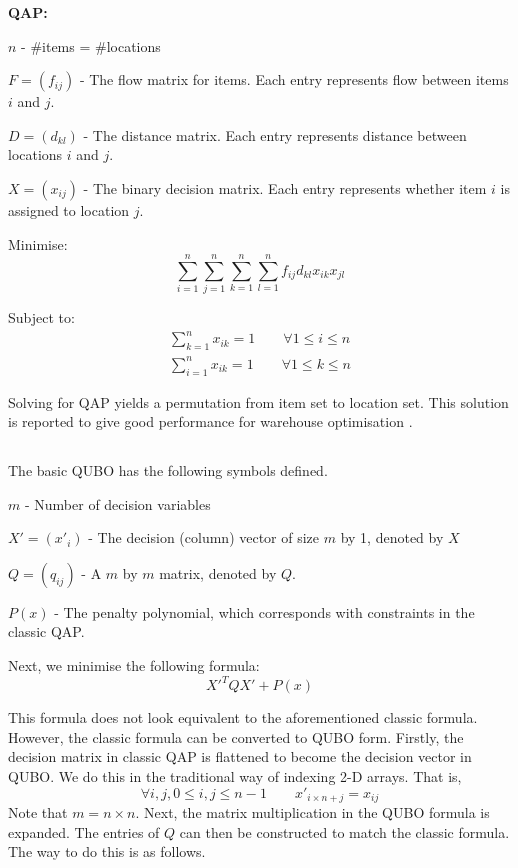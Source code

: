 \documentclass[hyp]{socreport}
\begin{document}
\textbf{QAP:}

$n$ - \#items = \#locations

$F = (f_{ij})$ - The flow matrix for items. Each entry represents flow between items $i$ and $j$.

$D = (d_{kl})$ - The distance matrix. Each entry represents distance between locations $i$ and $j$.

$X = (x_{ij})$ - The binary decision matrix. Each entry represents whether item $i$ is assigned to location $j$.

Minimise:
\begin{equation}
\sum_{i=1}^{n}\sum_{j=1}^{n}\sum_{k=1}^{n}\sum_{l=1}^{n}f_{ij}d_{kl}x_{ik}x_{jl}\end{equation}

Subject to:
\begin{align}
\sum_{k=1}^{n}x_{ik}=1 \qquad \forall 1\leq i \leq n \\
\sum_{i=1}^{n}x_{ik}=1 \qquad \forall 1\leq k \leq n
\end{align}

Solving for QAP yields a permutation from item set to location set. This solution is reported to give good performance for warehouse optimisation \cite{Mantel:2007}.

\subsection{}

The basic QUBO has the following symbols defined.

$m$		- Number of decision variables

$X'=(x'_i)$ - The decision (column) vector of size $m$ by 1, denoted by $X$

$Q=(q_{ij})$ - A $m$ by $m$ matrix, denoted by $Q$.

$P(x)$	- The penalty polynomial, which corresponds with constraints in the classic QAP.

Next, we minimise the following formula:
\[X'^TQX' + P(x)\]

This formula does not look equivalent to the aforementioned classic formula. However, the classic formula can be converted to QUBO form. Firstly, the decision matrix in classic QAP is flattened to become the decision vector in QUBO. We do this in the traditional way of indexing 2-D arrays. That is, \[\forall i,j, 0\leq i,j \leq n-1 \qquad x'_{i\times n+j} = x_{ij}\]
Note that $m = n\times n$.
Next, the matrix multiplication in the QUBO formula is expanded. The entries of $Q$ can then be constructed to match the classic formula. The way to do this is as follows.
\end{document}
